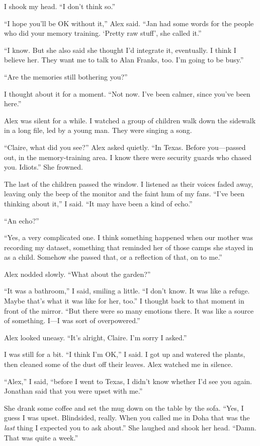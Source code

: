\documentclass[10pt,b5paper]{article}
\begin{document}
I shook my head. ``I don't think so.''

``I hope you'll be OK without it,'' Alex said. ``Jan had some words
for the people who did your memory training. `Pretty raw stuff',
she called it.''

``I know. But she also said she thought I'd integrate it, eventually. I
think I believe her. They want me to talk to Alan Franks, too. I'm
going to be busy.''

``Are the memories still bothering you?''

I thought about it for a moment. ``Not now. I've been calmer, since
you've been here.''

Alex was silent for a while. I watched a group of children walk down
the sidewalk in a long file, led by a young man. They were singing
a song.

``Claire, what did you see?'' Alex asked quietly. ``In Texas. Before
you---passed out, in the memory-training area. I know there were
security guards who chased you. Idiots.'' She frowned.

The last of the children passed the window. I listened as their voices
faded away, leaving only the beep of the monitor and the faint hum
of my fans. ``I've been thinking about it,'' I said. ``It may have
been a kind of echo.''

``An echo?''

``Yes, a very complicated one. I think something happened when our
mother was recording my dataset, something that reminded her of
those camps she stayed in as a child.  Somehow she passed that,
or a reflection of that, on to me.''

Alex nodded slowly. ``What about the garden?''

``It was a bathroom,'' I said, smiling a little. ``I don't know. It
was like a refuge. Maybe that's what it was like for her, too.'' I
thought back to that moment in front of the mirror. ``But there were
so many emotions there. It was like a source of something. I---I was
sort of overpowered.''

Alex looked uneasy. ``It's alright, Claire. I'm sorry I asked.''

I was still for a bit. ``I think I'm OK,'' I said. I got up and watered
the plants, then cleaned some of the dust off their leaves. Alex
watched me in silence.

``Alex,'' I said, ``before I went to Texas, I didn't know whether
I'd see you again. Jonathan said that you were upset with me.''

She drank some coffee and set the mug down on the table by the
sofa. ``Yes, I guess I was upset. Blindsided, really.  When you
called me in Doha that was the \emph{last} thing I expected you to
ask about.'' She laughed and shook her head. ``Damn. That was quite
a week.''
\end{document}
